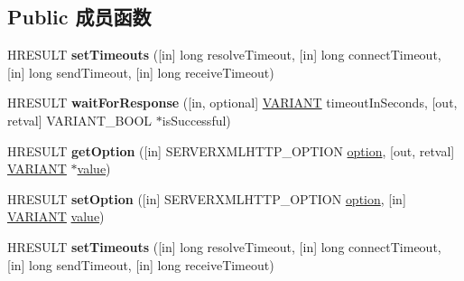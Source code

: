 \subsection*{Public 成员函数}
\begin{DoxyCompactItemize}
\item 
\mbox{\label{interface_m_s_x_m_l2_1_1_i_server_x_m_l_h_t_t_p_request_a1791c3ab4f5bfa6aaa606f37cc17a388}} 
H\+R\+E\+S\+U\+LT {\bfseries set\+Timeouts} (\mbox{[}in\mbox{]} long resolve\+Timeout, \mbox{[}in\mbox{]} long connect\+Timeout, \mbox{[}in\mbox{]} long send\+Timeout, \mbox{[}in\mbox{]} long receive\+Timeout)
\item 
\mbox{\label{interface_m_s_x_m_l2_1_1_i_server_x_m_l_h_t_t_p_request_a2f8cb1e8ab9a8953c9445e89d096ef7e}} 
H\+R\+E\+S\+U\+LT {\bfseries wait\+For\+Response} (\mbox{[}in, optional\mbox{]} \hyperlink{structtag_v_a_r_i_a_n_t}{V\+A\+R\+I\+A\+NT} timeout\+In\+Seconds, \mbox{[}out, retval\mbox{]} V\+A\+R\+I\+A\+N\+T\+\_\+\+B\+O\+OL $\ast$is\+Successful)
\item 
\mbox{\label{interface_m_s_x_m_l2_1_1_i_server_x_m_l_h_t_t_p_request_a321878f891dbf1c3b004a436b32003e0}} 
H\+R\+E\+S\+U\+LT {\bfseries get\+Option} (\mbox{[}in\mbox{]} S\+E\+R\+V\+E\+R\+X\+M\+L\+H\+T\+T\+P\+\_\+\+O\+P\+T\+I\+ON \hyperlink{structoption}{option}, \mbox{[}out, retval\mbox{]} \hyperlink{structtag_v_a_r_i_a_n_t}{V\+A\+R\+I\+A\+NT} $\ast$\hyperlink{unionvalue}{value})
\item 
\mbox{\label{interface_m_s_x_m_l2_1_1_i_server_x_m_l_h_t_t_p_request_a82f2ad35ab8cf252499f1ee5e2f647d2}} 
H\+R\+E\+S\+U\+LT {\bfseries set\+Option} (\mbox{[}in\mbox{]} S\+E\+R\+V\+E\+R\+X\+M\+L\+H\+T\+T\+P\+\_\+\+O\+P\+T\+I\+ON \hyperlink{structoption}{option}, \mbox{[}in\mbox{]} \hyperlink{structtag_v_a_r_i_a_n_t}{V\+A\+R\+I\+A\+NT} \hyperlink{unionvalue}{value})
\item 
\mbox{\label{interface_m_s_x_m_l2_1_1_i_server_x_m_l_h_t_t_p_request_a1791c3ab4f5bfa6aaa606f37cc17a388}} 
H\+R\+E\+S\+U\+LT {\bfseries set\+Timeouts} (\mbox{[}in\mbox{]} long resolve\+Timeout, \mbox{[}in\mbox{]} long connect\+Timeout, \mbox{[}in\mbox{]} long send\+Timeout, \mbox{[}in\mbox{]} long receive\+Timeout)

\end{DoxyCompactItemize}
